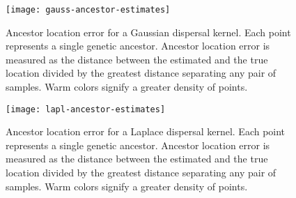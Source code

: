 \begin{figure}[ht]
\centering
\texttt{[image: gauss-ancestor-estimates]}
\caption{Ancestor location error for a Gaussian dispersal kernel. Each point
represents a single genetic ancestor. Ancestor location error is measured as
the distance between the estimated and the true location divided by the greatest
distance separating any pair of samples. Warm colors signify a greater density
of points.
}
\label{fig:gauss-ancestor-estimates}
\end{figure}

\begin{figure}[ht]
\centering
\texttt{[image: lapl-ancestor-estimates]}
\caption{Ancestor location error for a Laplace dispersal kernel. Each point
represents a single genetic ancestor. Ancestor location error is measured as
the distance between the estimated and the true location divided by the greatest
distance separating any pair of samples. Warm colors signify a greater density
of points.
}
\label{fig:lapl-ancestor-estimates}
\end{figure}
